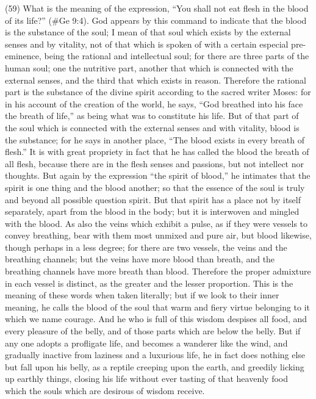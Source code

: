 (59) What is the meaning of the expression, ``You shall not eat flesh in the blood of its life?''
(\#Ge 9:4). God appears by this command to indicate that the blood is the substance of the
soul; I mean of that soul which exists by the external senses and by vitality, not of that which is
spoken of with a certain especial pre-eminence, being the rational and intellectual soul; for there
are three parts of the human soul; one the nutritive part, another that which is connected with the
external senses, and the third that which exists in reason. Therefore the rational part is the
substance of the divine spirit according to the sacred writer Moses: for in his account of the
creation of the world, he says, ``God breathed into his face the breath of life,'' as being what was to
constitute his life. But of that part of the soul which is connected with the external senses and with
vitality, blood is the substance; for he says in another place, ``The blood exists in every breath of
flesh.'' It is with great propriety in fact that he has called the blood the breath of all flesh, because
there are in the flesh senses and passions, but not intellect nor thoughts. But again by the
expression ``the spirit of blood,'' he intimates that the spirit is one thing and the blood another; so
that the essence of the soul is truly and beyond all possible question spirit. But that spirit has a
place not by itself separately, apart from the blood in the body; but it is interwoven and mingled with
the blood. As also the veins which exhibit a pulse, as if they were vessels to convey breathing,
bear with them most unmixed and pure air, but blood likewise, though perhaps in a less degree; for
there are two vessels, the veins and the breathing channels; but the veins have more blood than
breath, and the breathing channels have more breath than blood. Therefore the proper admixture
in each vessel is distinct, as the greater and the lesser proportion. This is the meaning of these
words when taken literally; but if we look to their inner meaning, he calls the blood of the soul that
warm and fiery virtue belonging to it which we name courage. And he who is full of this wisdom
despises all food, and every pleasure of the belly, and of those parts which are below the belly. But
if any one adopts a profligate life, and becomes a wanderer like the wind, and gradually inactive
from laziness and a luxurious life, he in fact does nothing else but fall upon his belly, as a reptile
creeping upon the earth, and greedily licking up earthly things, closing his life without ever tasting of
that heavenly food which the souls which are desirous of wisdom receive.

